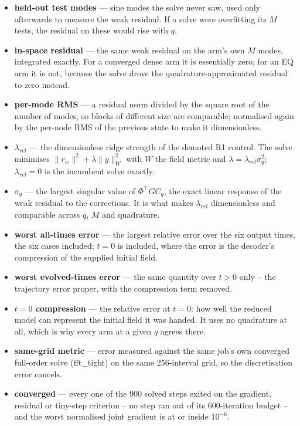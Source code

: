 \documentclass[11pt]{article}
\begin{document}
\begin{itemize}
\item \textbf{held-out test modes} --- sine modes the solve never saw, used only afterwards to measure the weak residual. If a solve were overfitting its $M$ tests, the residual on these would rise with $q$.
\item \textbf{in-space residual} --- the same weak residual on the arm's own $M$ modes, integrated exactly. For a converged dense arm it is essentially zero; for an EQ arm it is not, because the solve drove the quadrature-approximated residual to zero instead.
\item \textbf{per-mode RMS} --- a residual norm divided by the square root of the number of modes, so blocks of different size are comparable; normalised again by the per-node RMS of the previous state to make it dimensionless.
\item \textbf{$\lambda_{rel}$} --- the dimensionless ridge strength of the demoted R1 control. The solve minimises $\|r_w\|^2 + \lambda\|y\|_W^2$ with $W$ the field metric and $\lambda = \lambda_{rel}\sigma_q^2$; $\lambda_{rel} = 0$ is the incumbent solve exactly.
\item \textbf{$\sigma_q$} --- the largest singular value of $\Phi^\top G C_q$, the exact linear response of the weak residual to the corrections. It is what makes $\lambda_{rel}$ dimensionless and comparable across $q$, $M$ and quadrature.
\item \textbf{worst all-times error} --- the largest relative error over the six output times, the six cases included; $t=0$ is included, where the error is the decoder's compression of the supplied initial field.
\item \textbf{worst evolved-times error} --- the same quantity over $t>0$ only -- the trajectory error proper, with the compression term removed.
\item \textbf{$t=0$ compression} --- the relative error at $t=0$: how well the reduced model can represent the initial field it was handed. It uses no quadrature at all, which is why every arm at a given $q$ agrees there.
\item \textbf{same-grid metric} --- error measured against the same job's own converged full-order solve (fft\_tight) on the same 256-interval grid, so the discretisation error cancels.
\item \textbf{converged} --- every one of the 900 solved steps exited on the gradient, residual or tiny-step criterion -- no step ran out of its 600-iteration budget -- and the worst normalised joint gradient is at or inside $10^{-6}$.

\end{itemize}
\end{document}
